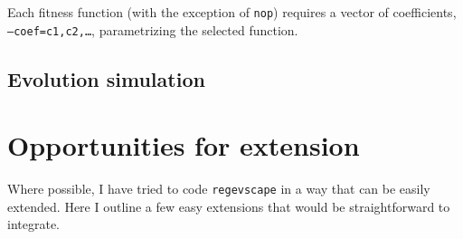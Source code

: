 \documentclass[11pt]{article}
\begin{document}
\noindent Each fitness function (with the exception of \texttt{nop}) requires a vector of coefficients, \texttt{--coef=c1,c2,\ldots}, parametrizing the selected function.

\subsection*{Evolution simulation}

\section*{Opportunities for extension}
Where possible, I have tried to code \texttt{regevscape} in a way that can be easily extended. Here I outline a few easy extensions that would be straightforward to integrate. 



\end{document}
